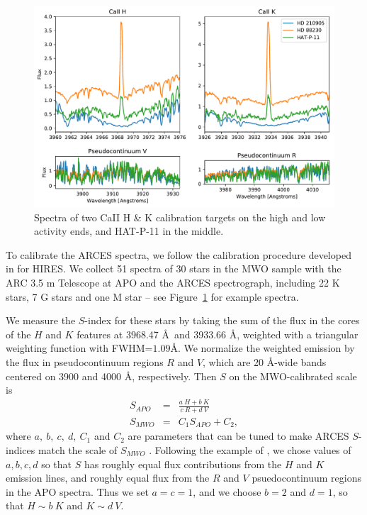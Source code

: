 \begin{figure}
\centering
\includegraphics[scale=0.4]{sindex/example_spectra.pdf}
\caption{Spectra of two CaII H \& K calibration targets on the high and low activity ends, and HAT-P-11 in the middle.}
\label{fig:examplespectra}
\end{figure}

To calibrate the ARCES spectra, we follow the calibration procedure developed in \citet{Isaacson2010} for HIRES. We collect 51 spectra of 30 stars in the \citet{Duncan1991} MWO sample with the ARC 3.5 m Telescope at APO and the ARCES spectrograph, including 22 K stars, 7 G stars and one M star -- see Figure~\ref{fig:examplespectra} for example spectra. 

We measure the $S$-index for these stars by taking the sum of the flux in the cores of the $H$ and $K$ features at 3968.47 \AA\ and 3933.66 \AA, weighted with a triangular weighting function with FWHM=$1.09$\AA. We normalize the weighted emission by the flux in pseudocontinuum regions $R$ and $V$, which are 20 \AA-wide bands centered on 3900 and 4000 \AA, respectively. Then $S$ on the MWO-calibrated scale is 
\begin{eqnarray}
S_{APO} &=& \frac{a~H + b~K}{c~R + d~V} \\
S_{MWO} &=& C_1 S_{APO} + C_2, \label{eqn:s_ind}
\end{eqnarray}
where $a,~b,~c,~d, ~C_1$ and $C_2$ are parameters that can be tuned to make ARCES $S$-indices match the scale of $S_{MWO}$ \citep{Duncan1991}. Following the example of \citet{Isaacson2010}, we chose values of $a,b,c,d$ so that $S$ has roughly equal flux contributions from the $H$ and $K$ emission lines, and roughly equal flux from the $R$ and $V$ psuedocontinuum regions in the APO spectra. Thus we set $a = c = 1$, and we choose $b=2$ and $d=1$, so that $H \sim b~K$ and $K \sim d~V$. 

